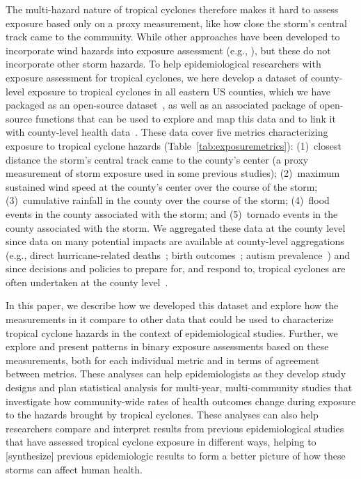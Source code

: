 The multi-hazard nature of tropical cyclones therefore makes it hard to assess
exposure based only on a proxy measurement, like how close the storm's central
track came to the community. While other approaches have been developed to
incorporate wind hazards into exposure assessment (e.g.,
\cite{grabich2015measuring, zandbergen2009}), but these do not incorporate other
storm hazards. To help epidemiological researchers with exposure assessment for
tropical cyclones, we here develop a dataset of county-level exposure to
tropical cyclones in all eastern \ac{US} counties, which we have packaged as an
open-source dataset~\parencite{hurricaneexposure}, as well as an associated
package of open-source functions that can be used to explore and map this data
and to link it with county-level health data~\parencite{hurricaneexposuredata}.
These data cover five metrics characterizing exposure to tropical cyclone
hazards (Table~\ref{tab:exposuremetrics}): (1)~closest distance the storm's
central track came to the county's center (a proxy measurement of storm
exposure used in some previous studies); (2)~maximum sustained wind speed at
the county's center over the course of the storm; (3)~cumulative rainfall in
the county over the course of the storm; (4)~flood events in the county
associated with the storm; and (5)~tornado events in the county associated with
the storm.  We aggregated these data at the county level since data on many
potential impacts are available at county-level aggregations (e.g., direct
hurricane-related deaths~\parencite{czajkowski2011}; birth
outcomes~\parencite{grabich2015, grabich2016}; autism
prevalence~\parencite{kinney2008}) and since decisions and policies to prepare
for, and respond to, tropical cyclones are often undertaken at the county
level~\parencite{zandbergen2009, rappaport2000}. 

In this paper, we describe how we developed this dataset and explore how the
measurements in it compare to other data that could be used to characterize
tropical cyclone hazards in the context of epidemiological studies.  Further,
we explore and present patterns in binary exposure assessments based on these
measurements, both for each individual metric and in terms of agreement between
metrics. These analyses can help epidemiologists as they develop study designs
and plan statistical analysis for multi-year, multi-community studies that
investigate how community-wide rates of health outcomes change during exposure
to the hazards brought by tropical cyclones. These analyses can also help
researchers compare and interpret results from previous epidemiological studies
that have assessed tropical cyclone exposure in different ways, helping to
[synthesize] previous epidemiologic results to form a better picture of how
these storms can affect human health. 
